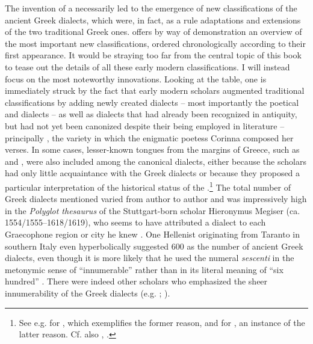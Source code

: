 The invention of a  necessarily led to the emergence of new classifications of the ancient Greek dialects, which were, in fact, as a rule adaptations and extensions of the two traditional Greek ones.  offers by way of demonstration an overview of the most important new classifications, ordered chronologically according to their first appearance. It would be straying too far from the central topic of this book to tease out the details of all these early modern classifications. I will instead focus on the most noteworthy innovations. Looking at the table, one is immediately struck by the fact that early modern scholars augmented traditional classifications by adding newly created dialects – most importantly the poetical and  dialects – as well as dialects that had already been recognized in antiquity, but had not yet been canonized despite their being employed in literature – principally , the variety in which the enigmatic poetess Corinna composed her verses. In some cases, lesser-known tongues from the margins of Greece, such as  and , were also included among the canonical dialects, either because the scholars had only little acquaintance with the Greek dialects or because they proposed a particular interpretation of the historical status of the .\footnote{See e.g. \citet[131]{Kircher1679} for , which exemplifies the former reason, and \citet[\textsc{c.2}\textsc{\textsuperscript{v}}]{Schwartz1702} for , an instance of the latter reason. Cf. also , .} The total number of Greek dialects mentioned varied from author to author and was impressively high in the \textit{Polyglot thesaurus} of the Stuttgart-born scholar Hieronymus Megiser (ca. 1554/1555–1618/1619), who seems to have attributed a dialect to each Graecophone region or city he knew \citep[{\footnotesize{)(}}.7\textsc{\textsuperscript{r}}--7\textsc{\textsuperscript{v}}]{Megiser1603}. One Hellenist originating from Taranto in southern Italy even hyperbolically suggested 600 as the number of ancient Greek dialects, even though it is more likely that he used the  numeral \textit{sescenti} in the metonymic sense of “innumerable” rather than in its literal meaning of “six hundred” \citep[9]{Giovane1589}. There were indeed other scholars who emphasized the sheer innumerability of the Greek dialects (e.g. \citealt[127]{Bischoff1708}; \citealt[196]{Ries1786}).


